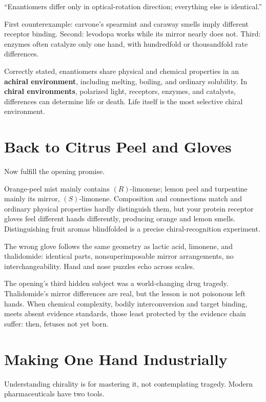 \begin{wuqu}
``Enantiomers differ only in optical-rotation direction; everything else is identical.''

First counterexample: carvone's spearmint and caraway smells imply different receptor binding. Second: levodopa works while its mirror nearly does not. Third: enzymes often catalyze only one hand, with hundredfold or thousandfold rate differences.

Correctly stated, enantiomers share physical and chemical properties in an \textbf{achiral environment}, including melting, boiling, and ordinary solubility. In \textbf{chiral environments}, polarized light, receptors, enzymes, and catalysts, differences can determine life or death. Life itself is the most selective chiral environment.
\end{wuqu}

\section{Back to Citrus Peel and Gloves}

Now fulfill the opening promise.

Orange-peel mist mainly contains $(R)$-limonene; lemon peel and turpentine mainly its mirror, $(S)$-limonene. Composition and connections match and ordinary physical properties hardly distinguish them, but your protein receptor gloves feel different hands differently, producing orange and lemon smells. Distinguishing fruit aromas blindfolded is a precise chiral-recognition experiment.

The wrong glove follows the same geometry as lactic acid, limonene, and thalidomide: identical parts, nonsuperimposable mirror arrangements, no interchangeability. Hand and nose puzzles echo across scales.

The opening's third hidden subject was a world-changing drug tragedy. Thalidomide's mirror differences are real, but the lesson is not poisonous left hands. When chemical complexity, bodily interconversion and target binding, meets absent evidence standards, those least protected by the evidence chain suffer: then, fetuses not yet born.

\section{Making One Hand Industrially}

Understanding chirality is for mastering it, not contemplating tragedy. Modern pharmaceuticals have two tools.

